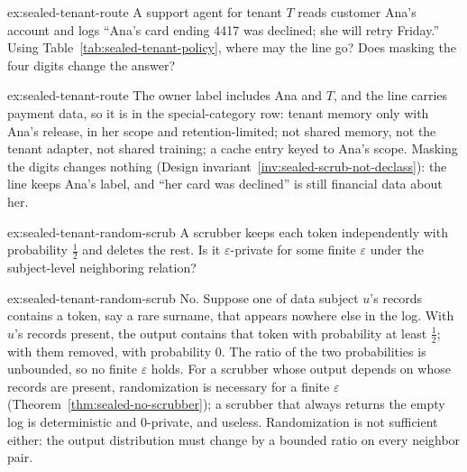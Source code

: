 
\begin{pdexercise}[kind=Check,rating=1]{ex:sealed-tenant-route}
A support agent for tenant $T$ reads customer Ana's account and logs ``Ana's
card ending 4417 was declined; she will retry Friday.'' Using
Table~\ref{tab:sealed-tenant-policy}, where may the line go? Does masking the
four digits change the answer?
\end{pdexercise}
\begin{pdsolution}{ex:sealed-tenant-route}
The owner label includes Ana and $T$, and the line carries payment data, so it
is in the special-category row: tenant memory only with Ana's release, in her
scope and retention-limited; not shared memory, not the tenant adapter, not
shared training; a cache entry keyed to Ana's scope. Masking the digits
changes nothing (Design invariant~\ref{inv:sealed-scrub-not-declass}): the
line keeps Ana's label, and ``her card was declined'' is still financial data
about her.
\end{pdsolution}

\begin{pdexercise}[kind=Check,rating=2]{ex:sealed-tenant-random-scrub}
A scrubber keeps each token independently with probability $\tfrac12$ and
deletes the rest. Is it $\varepsilon$-private for some finite $\varepsilon$
under the subject-level neighboring relation?
\end{pdexercise}
\begin{pdsolution}{ex:sealed-tenant-random-scrub}
No. Suppose one of data subject $u$'s records contains a token, say a rare
surname, that appears nowhere else in the log. With $u$'s records present, the
output contains that token with probability at least $\tfrac12$; with them removed, with probability
$0$. The ratio of the two probabilities is unbounded, so no finite
$\varepsilon$ holds. For a scrubber whose output depends on whose records are
present, randomization is necessary for a finite $\varepsilon$
(Theorem~\ref{thm:sealed-no-scrubber}); a scrubber that always returns the
empty log is deterministic and $0$-private, and useless. Randomization is not
sufficient either: the output distribution must change by a bounded ratio on
every neighbor pair.
\end{pdsolution}

